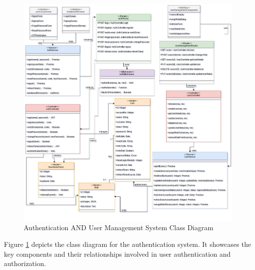 \newpage    

\begin{figure}[htbp]
    \centering
    \includegraphics[width=1\textwidth]{images/auth_classdiag.PNG}
    \caption{Authentication AND User Management System Class Diagram}
    \label{fig:auth-class-diagram}
\end{figure}

Figure \ref{fig:auth-class-diagram} depicts the class diagram for the authentication system. It showcases the key components and their relationships involved in user authentication and authorization.

\newpage

